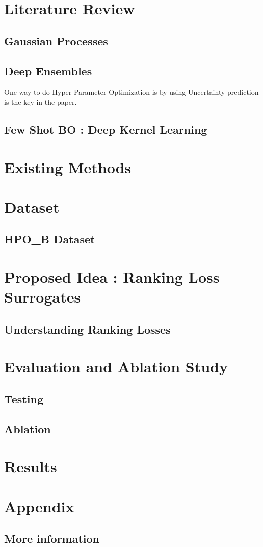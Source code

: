 \documentclass[11pt]{article}
\begin{document}
\section{Literature Review}
\subsection{Gaussian Processes}
\subsection{Deep Ensembles}
One way to do Hyper Parameter Optimization is by using 
Uncertainty prediction is the key in the paper. \cite{DeepEnsemblePaper}

\subsection{Few Shot BO : Deep Kernel Learning}


\section{Existing Methods}

\section{Dataset}
\subsection{HPO\_B Dataset}

\section{Proposed Idea : Ranking Loss Surrogates}

\subsection{Understanding Ranking Losses}



\section{Evaluation and Ablation Study}
\subsection{Testing}
\subsection{Ablation}

\section{Results}




\section{Appendix}
\subsection{More information}
\end{document}
